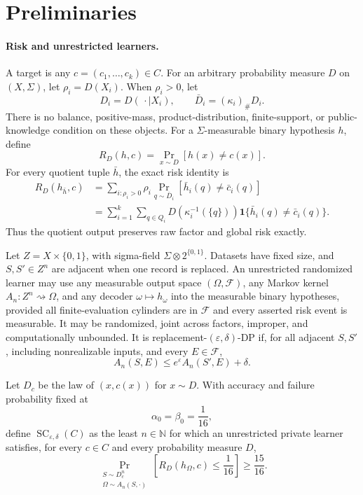 \section{Preliminaries}\label{sec:preliminaries}

\paragraph{Risk and unrestricted learners.}
A target is any \(c=(c_1,\ldots,c_k)\in C\).  For an arbitrary
probability measure \(D\) on \((X,\Sigma)\), let
\(\rho_i=D(X_i)\).  When \(\rho_i>0\), let
\[
D_i=D(\,\cdot\mid X_i),
\qquad
\bar D_i=(\kappa_i)_\#D_i.
\]
There is no balance, positive-mass, product-distribution,
finite-support, or public-knowledge condition on these objects.  For a
\(\Sigma\)-measurable binary hypothesis \(h\), define
\[
R_D(h,c)=\Pr_{x\sim D}[h(x)\ne c(x)].
\]
For every quotient tuple \(\bar h\), the exact risk identity is
\begin{equation}\label{eq:prelim-exact-risk}
\begin{aligned}
R_D(h_{\bar h},c)
&=\sum_{i:\rho_i>0}\rho_i
  \Pr_{q\sim\bar D_i}[\bar h_i(q)\ne\bar c_i(q)]\\
&=\sum_{i=1}^k\sum_{q\in Q_i}
  D(\kappa_i^{-1}(\{q\}))
  \mathbf1\{\bar h_i(q)\ne\bar c_i(q)\}.
\end{aligned}
\end{equation}
Thus the quotient output preserves raw factor and global risk exactly.

Let \(Z=X\times\{0,1\}\), with sigma-field
\(\Sigma\otimes2^{\{0,1\}}\).  Datasets have fixed size, and
\(S,S'\in Z^n\) are adjacent when one record is replaced.  An
unrestricted randomized learner may use any measurable output space
\((\Omega,\mathscr F)\), any Markov kernel
\(A_n:Z^n\rightsquigarrow\Omega\), and any decoder
\(\omega\mapsto h_\omega\) into the measurable binary hypotheses,
provided all finite-evaluation cylinders are in \(\mathscr F\) and
every asserted risk event is measurable.  It may be randomized, joint
across factors, improper, and computationally unbounded.  It is
replacement-\((\varepsilon,\delta)\)-DP if, for all adjacent
\(S,S'\), including nonrealizable inputs, and every \(E\in\mathscr F\),
\begin{equation}\label{eq:prelim-dp}
A_n(S,E)\le e^\varepsilon A_n(S',E)+\delta.
\end{equation}

Let \(D_c\) be the law of \((x,c(x))\) for \(x\sim D\).  With accuracy
and failure probability fixed at
\[
\alpha_0=\beta_0=\frac1{16},
\]
define \(\operatorname{SC}_{\varepsilon,\delta}(C)\) as the least
\(n\in\mathbb N\) for which an unrestricted private learner satisfies,
for every \(c\in C\) and every probability measure \(D\),
\begin{equation}\label{eq:prelim-sc}
\Pr_{\substack{S\sim D_c^n\\
                \Omega\sim A_n(S,\cdot)}}
\left[R_D(h_\Omega,c)\le\frac1{16}\right]
\ge\frac{15}{16}.
\end{equation}

